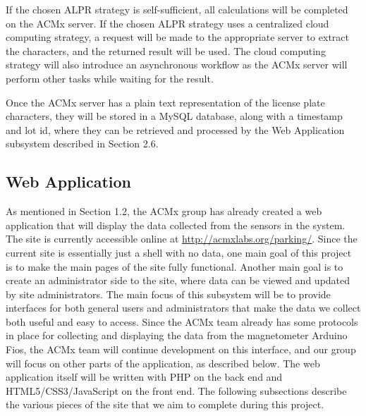 \documentclass[11pt, oneside, fullpage, doublespace]{article}
\begin{document}
If the chosen ALPR strategy is self-sufficient, all calculations will be completed on the ACMx server. If the chosen ALPR strategy uses a centralized cloud computing strategy, a request will be made to the appropriate server to extract the characters, and the returned result will be used. The cloud computing strategy will also introduce an asynchronous workflow as the ACMx server will perform other tasks while waiting for the result.

Once the ACMx server has a plain text representation of the license plate characters, they will be stored in a MySQL database, along with a timestamp and lot id, where they can be retrieved and processed by the Web Application subsystem described in Section 2.6.

\subsection{Web Application}
As mentioned in Section 1.2, the ACMx group has already created a web application that will display the data collected from the sensors in the system. The site is currently accessible online at \url{http://acmxlabs.org/parking/}. Since the current site is essentially just a shell with no data, one main goal of this project is to make the main pages of the site fully functional. Another main goal is to create an administrator side to the site, where data can be viewed and updated by site administrators. The main focus of this subsystem will be to provide interfaces for both general users and administrators that make the data we collect both useful and easy to access. Since the ACMx team already has some protocols in place for collecting and displaying the data from the magnetometer Arduino Fios, the ACMx team will continue development on this interface, and our group will focus on other parts of the application, as described below. The web application itself will be written with PHP on the back end and HTML5/CSS3/JavaScript on the front end. The following subsections describe the various pieces of the site that we aim to complete during this project.
\end{document}
